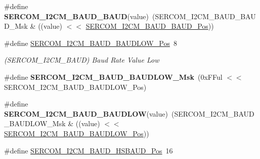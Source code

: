 \begin{DoxyCompactItemize}
\item 
\hypertarget{group___s_a_m_l21___s_e_r_c_o_m_gaca8d2f4e0bd8923b95ebaf476f4dacd5}{}\#define {\bfseries S\+E\+R\+C\+O\+M\+\_\+\+I2\+C\+M\+\_\+\+B\+A\+U\+D\+\_\+\+B\+A\+U\+D}(value)~(S\+E\+R\+C\+O\+M\+\_\+\+I2\+C\+M\+\_\+\+B\+A\+U\+D\+\_\+\+B\+A\+U\+D\+\_\+\+Msk \& ((value) $<$$<$ \hyperlink{group___s_a_m_l21___s_e_r_c_o_m_gab6a631816c48cd99d04ebb88f7363077}{S\+E\+R\+C\+O\+M\+\_\+\+I2\+C\+M\+\_\+\+B\+A\+U\+D\+\_\+\+B\+A\+U\+D\+\_\+\+Pos}))\label{group___s_a_m_l21___s_e_r_c_o_m_gaca8d2f4e0bd8923b95ebaf476f4dacd5}

\item 
\hypertarget{group___s_a_m_l21___s_e_r_c_o_m_ga7efafb1557d001cf321357281e688f7c}{}\#define \hyperlink{group___s_a_m_l21___s_e_r_c_o_m_ga7efafb1557d001cf321357281e688f7c}{S\+E\+R\+C\+O\+M\+\_\+\+I2\+C\+M\+\_\+\+B\+A\+U\+D\+\_\+\+B\+A\+U\+D\+L\+O\+W\+\_\+\+Pos}~8\label{group___s_a_m_l21___s_e_r_c_o_m_ga7efafb1557d001cf321357281e688f7c}

\begin{DoxyCompactList}\small\item\em (S\+E\+R\+C\+O\+M\+\_\+\+I2\+C\+M\+\_\+\+B\+A\+U\+D) Baud Rate Value Low \end{DoxyCompactList}\item 
\hypertarget{group___s_a_m_l21___s_e_r_c_o_m_ga64079a168c23f86faefdbde85bd530ba}{}\#define {\bfseries S\+E\+R\+C\+O\+M\+\_\+\+I2\+C\+M\+\_\+\+B\+A\+U\+D\+\_\+\+B\+A\+U\+D\+L\+O\+W\+\_\+\+Msk}~(0x\+F\+Ful $<$$<$ S\+E\+R\+C\+O\+M\+\_\+\+I2\+C\+M\+\_\+\+B\+A\+U\+D\+\_\+\+B\+A\+U\+D\+L\+O\+W\+\_\+\+Pos)\label{group___s_a_m_l21___s_e_r_c_o_m_ga64079a168c23f86faefdbde85bd530ba}

\item 
\hypertarget{group___s_a_m_l21___s_e_r_c_o_m_ga4929af22d9e85eab791017c71419cc3c}{}\#define {\bfseries S\+E\+R\+C\+O\+M\+\_\+\+I2\+C\+M\+\_\+\+B\+A\+U\+D\+\_\+\+B\+A\+U\+D\+L\+O\+W}(value)~(S\+E\+R\+C\+O\+M\+\_\+\+I2\+C\+M\+\_\+\+B\+A\+U\+D\+\_\+\+B\+A\+U\+D\+L\+O\+W\+\_\+\+Msk \& ((value) $<$$<$ \hyperlink{group___s_a_m_l21___s_e_r_c_o_m_ga7efafb1557d001cf321357281e688f7c}{S\+E\+R\+C\+O\+M\+\_\+\+I2\+C\+M\+\_\+\+B\+A\+U\+D\+\_\+\+B\+A\+U\+D\+L\+O\+W\+\_\+\+Pos}))\label{group___s_a_m_l21___s_e_r_c_o_m_ga4929af22d9e85eab791017c71419cc3c}

\item 
\hypertarget{group___s_a_m_l21___s_e_r_c_o_m_gaaef72152e2e2560359aca1af29756158}{}\#define \hyperlink{group___s_a_m_l21___s_e_r_c_o_m_gaaef72152e2e2560359aca1af29756158}{S\+E\+R\+C\+O\+M\+\_\+\+I2\+C\+M\+\_\+\+B\+A\+U\+D\+\_\+\+H\+S\+B\+A\+U\+D\+\_\+\+Pos}~16\label{group___s_a_m_l21___s_e_r_c_o_m_gaaef72152e2e2560359aca1af29756158}


\end{DoxyCompactItemize}
